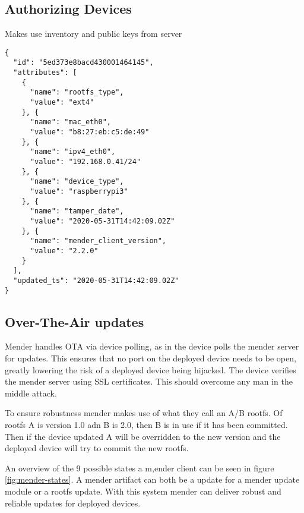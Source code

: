 \documentclass[../../main.tex]{subfiles}
\begin{document}
\subsection{Authorizing Devices}%
\label{sub:authorizing_devices}

Makes use inventory and public keys from server

\begin{verbatim}
{
  "id": "5ed373e8bacd430001464145",
  "attributes": [
    {
      "name": "rootfs_type",
      "value": "ext4"
    }, {
      "name": "mac_eth0",
      "value": "b8:27:eb:c5:de:49"
    }, {
      "name": "ipv4_eth0",
      "value": "192.168.0.41/24"
    }, {
      "name": "device_type",
      "value": "raspberrypi3"
    }, {
      "name": "tamper_date",
      "value": "2020-05-31T14:42:09.02Z"
    }, {
      "name": "mender_client_version",
      "value": "2.2.0"
    }
  ],
  "updated_ts": "2020-05-31T14:42:09.02Z"
}

\end{verbatim}




\subsection{Over-The-Air updates}%
\label{sub:over_the_air_updates}

Mender handles OTA via device polling, as in the device polls the mender server for updates.
This ensures that no port on the deployed device needs to be open, greatly lowering the risk of
a deployed device being hijacked.
The device verifies the mender server using SSL certificates.
This should overcome any man in the middle attack.

To ensure robustness mender makes use of what they call an A/B rootfs.
Of rootfs A is version 1.0 adn B is 2.0, then B is in use if it has been committed.
Then if the device updated A will be overridden to the new version and the deployed device will
try to commit the new rootfs.

An overview of the 9 possible states a m,ender client can be seen in figure \ref{fig:mender-states}.
A mender artifact can both be a update for a mender update module or a rootfs update.
With this system mender can deliver robust and reliable updates for deployed devices.
\end{document}
